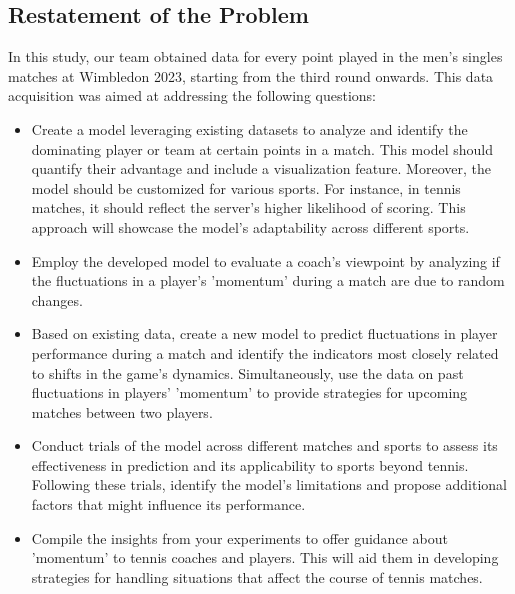 \documentclass[12pt]{article}  %
\begin{document}
\subsection{Restatement of the Problem}
In this study, our team obtained data for every point played in the men's singles matches at Wimbledon 2023, 
starting from the third round onwards. 
This data acquisition was aimed at addressing the following questions:
\begin{itemize}
\setlength{\parsep}{0ex} %
\setlength{\topsep}{2ex} %
\setlength{\itemsep}{1ex} %
\item Create a model leveraging existing datasets to analyze and identify the dominating player or team at certain points in a match. 
This model should quantify their advantage and include a visualization feature. 
Moreover, the model should be customized for various sports. 
For instance, in tennis matches, 
it should reflect the server's higher likelihood of scoring. 
This approach will showcase the model's adaptability across different sports.
\item Employ the developed model to evaluate a coach's viewpoint by analyzing if the fluctuations 
in a player's 'momentum' during a match are due to random changes.
\item Based on existing data, create a new model to predict fluctuations in player performance 
during a match and identify the indicators most closely related to shifts in the game's dynamics. 
Simultaneously, use the data on past fluctuations in players' 'momentum' to provide strategies for upcoming matches between two players.
\item Conduct trials of the model across different matches and sports to assess its effectiveness in prediction and 
its applicability to sports beyond tennis. 
Following these trials, identify the model's limitations and propose additional factors that might influence its performance.
\item Compile the insights from your experiments to offer guidance about 'momentum' to tennis coaches and players. 
This will aid them in developing strategies for handling situations that affect the course of tennis matches.
\end{itemize}
\end{document}

